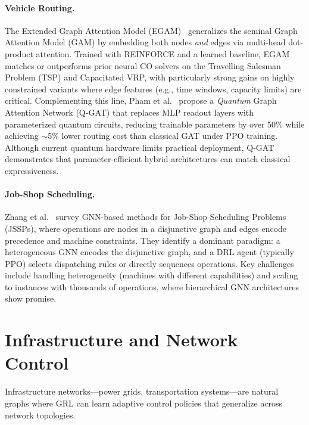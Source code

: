 \documentclass{article}
\begin{document}
\paragraph{Vehicle Routing.}
The Extended Graph Attention Model (EGAM)~\cite{egam2026} generalizes the seminal Graph Attention Model (GAM) by embedding both nodes \emph{and} edges via multi-head dot-product attention. Trained with REINFORCE and a learned baseline, EGAM matches or outperforms prior neural CO solvers on the Travelling Salesman Problem (TSP) and Capacitated VRP, with particularly strong gains on highly constrained variants where edge features (e.g., time windows, capacity limits) are critical. Complementing this line, Pham et al.~\cite{qgat2025} propose a \emph{Quantum} Graph Attention Network (Q-GAT) that replaces MLP readout layers with parameterized quantum circuits, reducing trainable parameters by over 50\% while achieving $\sim$5\% lower routing cost than classical GAT under PPO training. Although current quantum hardware limits practical deployment, Q-GAT demonstrates that parameter-efficient hybrid architectures can match classical expressiveness.

\paragraph{Job-Shop Scheduling.}
Zhang et al.~\cite{gnn_jssp2024} survey GNN-based methods for Job-Shop Scheduling Problems (JSSPs), where operations are nodes in a disjunctive graph and edges encode precedence and machine constraints. They identify a dominant paradigm: a heterogeneous GNN encodes the disjunctive graph, and a DRL agent (typically PPO) selects dispatching rules or directly sequences operations. Key challenges include handling heterogeneity (machines with different capabilities) and scaling to instances with thousands of operations, where hierarchical GNN architectures show promise.

\section{Infrastructure and Network Control}\label{sec:infra}

Infrastructure networks---power grids, transportation systems---are natural graphs where GRL can learn adaptive control policies that generalize across network topologies.
\end{document}
